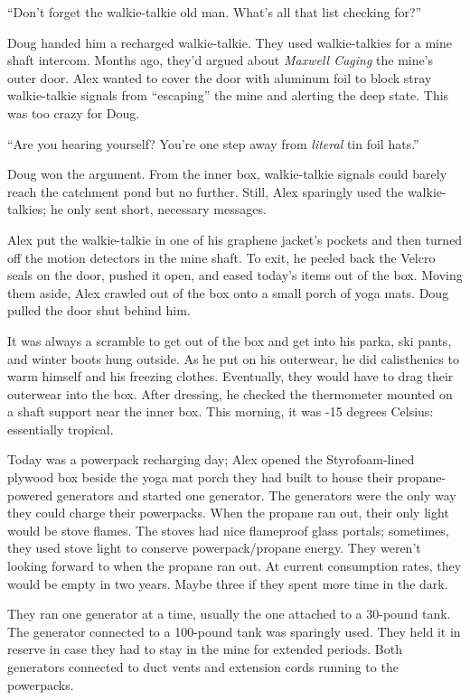 ``Don't forget the walkie-talkie old man. What's all that list checking
for?''

Doug handed him a recharged walkie-talkie. They used walkie-talkies for
a mine shaft intercom. Months ago, they'd argued about \emph{Maxwell
Caging} the mine's outer door. Alex wanted to cover the door with
aluminum foil to block stray walkie-talkie signals from ``escaping'' the
mine and alerting the deep state. This was too crazy for Doug.

``Are you hearing yourself? You're one step away from \emph{literal} tin
foil hats.''

Doug won the argument. From the inner box, walkie-talkie signals could
barely reach the catchment pond but no further. Still, Alex sparingly
used the walkie-talkies; he only sent short, necessary messages.

Alex put the walkie-talkie in one of his graphene jacket's pockets and
then turned off the motion detectors in the mine shaft. To exit, he
peeled back the Velcro seals on the door, pushed it open, and eased
today's items out of the box. Moving them aside, Alex crawled out of the
box onto a small porch of yoga mats. Doug pulled the door shut behind
him.

It was always a scramble to get out of the box and get into his parka,
ski pants, and winter boots hung outside. As he put on his outerwear, he
did calisthenics to warm himself and his freezing clothes. Eventually,
they would have to drag their outerwear into the box. After dressing, he
checked the thermometer mounted on a shaft support near the inner box.
This morning, it was -15 degrees Celsius: essentially tropical.

Today was a powerpack recharging day; Alex opened the Styrofoam-lined
plywood box beside the yoga mat porch they had built to house their
propane-powered generators and started one generator. The generators
were the only way they could charge their powerpacks. When the propane
ran out, their only light would be stove flames. The stoves had nice
flameproof glass portals; sometimes, they used stove light to conserve
powerpack/propane energy. They weren't looking forward to when the
propane ran out. At current consumption rates, they would be empty in
two years. Maybe three if they spent more time in the dark.

They ran one generator at a time, usually the one attached to a 30-pound
tank. The generator connected to a 100-pound tank was sparingly used.
They held it in reserve in case they had to stay in the mine for
extended periods. Both generators connected to duct vents and extension
cords running to the powerpacks.


